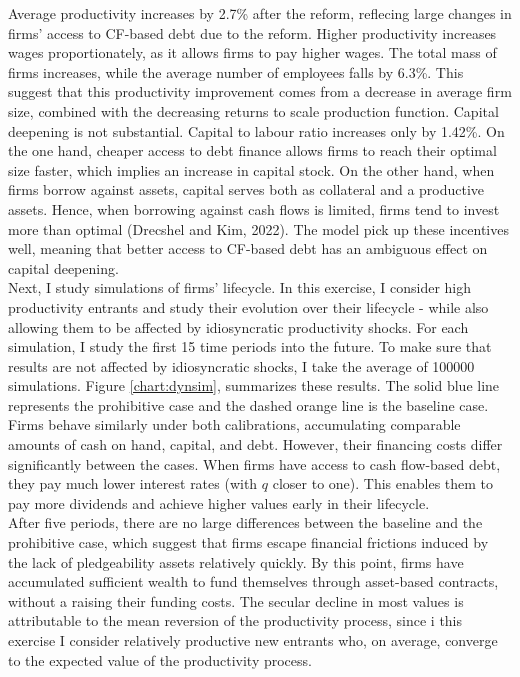 \documentclass[12pt]{article}
\begin{document}
\noindent Average productivity increases by 2.7\% after the reform, reflecing large changes in firms' access to CF-based debt due to the reform. Higher productivity increases wages proportionately, as it allows firms to pay higher wages. The total mass of firms increases, while the average number of employees falls by 6.3\%. This suggest that this productivity improvement comes from a decrease in average firm size, combined with the decreasing returns to scale production function. Capital deepening is not substantial. Capital to labour ratio increases only by 1.42\%. On the one hand, cheaper access to debt finance allows firms to reach their optimal size faster, which implies an increase in capital stock. On the other hand, when firms borrow against assets, capital serves both as collateral and a productive assets. Hence, when borrowing against cash flows is limited, firms tend to invest more than optimal (Drecshel and Kim, 2022). The model pick up these incentives well, meaning that better access to CF-based debt has an ambiguous effect on capital deepening. \vspace{3mm} \\



 Next, I study simulations of firms' lifecycle. In this exercise, I consider high productivity entrants and study their evolution over their lifecycle - while also allowing them to be affected by idiosyncratic productivity shocks. For each simulation, I study the first 15 time periods into the future. To make sure that results are not affected by idiosyncratic shocks, I take the average of 100000 simulations. Figure \ref{chart:dynsim}, summarizes these results. The solid blue line represents the prohibitive case and the dashed orange line is the baseline case. Firms behave similarly under both calibrations, accumulating comparable amounts of cash on hand, capital, and debt. However, their financing costs differ significantly between the cases. When firms have access to cash flow-based debt, they pay much lower interest rates (with $q$ closer to one). This enables them to pay more dividends and achieve higher values early in their lifecycle. \vspace{3mm} \\
After five periods, there are no large differences between the baseline and the prohibitive case, which suggest that firms escape financial frictions induced by the lack of pledgeability assets relatively quickly. By this point, firms have accumulated sufficient wealth to fund themselves through asset-based contracts, without a raising their funding costs. The secular decline in most values is attributable to the mean reversion of the productivity process, since i this exercise I consider relatively productive new entrants who, on average, converge to the expected value of the productivity process.
\end{document}
